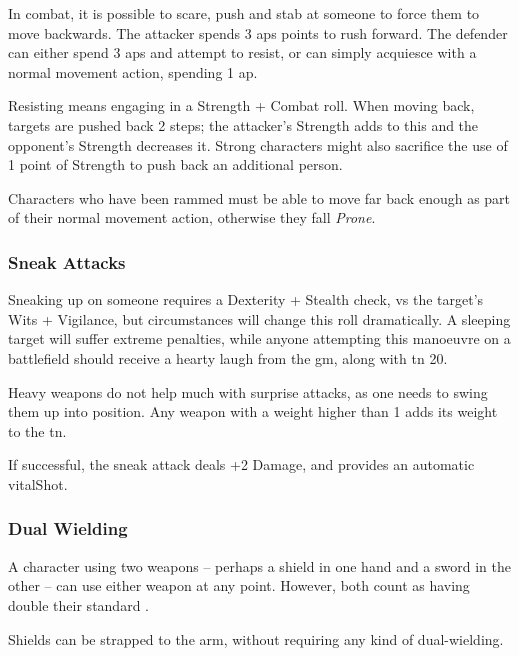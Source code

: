 \begin{multicols}{2}
In combat, it is possible to scare, push and stab at someone to force them to move backwards.
The attacker spends 3 \glspl{ap} points to rush forward.
The defender can either spend 3 \glspl{ap} and attempt to resist, or can simply acquiesce with a normal movement action, spending 1 \gls{ap}.

Resisting means engaging in a Strength + Combat roll.
When moving back, targets are pushed back 2 steps; the attacker's Strength adds to this and the opponent's Strength decreases it.
Strong characters might also sacrifice the use of 1 point of Strength to push back an additional person.

Characters who have been rammed must be able to move far back enough as part of their normal movement action, otherwise they fall \textit{Prone}.

\subsubsection[Sneak Attack: Dexterity + Stealth vs Wits + Vigilance; automatic \glsentrytext{vitalShot} with +2 Damage.]{Sneak Attacks}
\label{sneakattack}

Sneaking up on someone requires a Dexterity + Stealth check, vs the target's Wits + Vigilance, but circumstances will change this roll dramatically.
A sleeping target will suffer extreme penalties, while anyone attempting this manoeuvre on a battlefield should receive a hearty laugh from the \gls{gm}, along with \gls{tn} 20.

Heavy weapons do not help much with surprise attacks, as one needs to swing them up into position.
Any weapon with a \gls{weight} higher than 1 adds its \gls{weight} to the \gls{tn}.

If successful, the sneak attack deals +2 Damage, and provides an automatic \gls{vitalShot}.

\subsubsection[Dual Wielding: Both weapons count has having +1 \glsentrytext{weight}]{Dual Wielding}

A character using two weapons -- perhaps a shield in one hand and a sword in the other -- can use either weapon at any point.
However, both count as having double their standard .

Shields can be strapped to the arm, without requiring any kind of dual-wielding.

\stopcontents[Manoeuvres]

\end{multicols}

